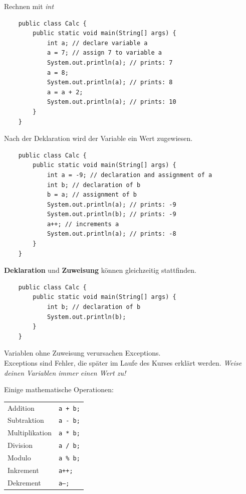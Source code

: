 \begin{frame}{Rechnen mit \emph{int}}
	\begin{lstlisting}
	public class Calc {
	    public static void main(String[] args) {
	        int a; // declare variable a
	        a = 7; // assign 7 to variable a
	        System.out.println(a); // prints: 7
	        a = 8;
	        System.out.println(a); // prints: 8
	        a = a + 2;
	        System.out.println(a); // prints: 10
	    }
	}
	\end{lstlisting}
	Nach der Deklaration wird der Variable ein Wert zugewiesen.
\framebreak
	\begin{lstlisting}
	public class Calc {
	    public static void main(String[] args) {
	        int a = -9; // declaration and assignment of a
	        int b; // declaration of b
	        b = a; // assignment of b
	        System.out.println(a); // prints: -9
	        System.out.println(b); // prints: -9
	        a++; // increments a
	        System.out.println(a); // prints: -8
	    }
	}
	\end{lstlisting}
	\textbf{Deklaration} und \textbf{Zuweisung} können gleichzeitig stattfinden.
\framebreak
	\begin{lstlisting}
	public class Calc {
	    public static void main(String[] args) {
	        int b; // declaration of b
	        System.out.println(b);
	    }
	}
	\end{lstlisting}
	Variablen ohne Zuweisung verursachen Exceptions.\\
	Exceptions sind Fehler, die später im Laufe des Kurses erklärt werden.
	\vspace{1em}
	\emph{Weise deinen Variablen immer einen Wert zu!}
\framebreak

	Einige mathematische Operationen:
	\begin{tabular}{ll}
		Addition & \texttt{a + b;} \\
		Subtraktion & \texttt{a - b;} \\
		Multiplikation &\texttt{a * b;} \\
		Division & \texttt{a / b;} \\
		Modulo & \texttt{a \% b;} \\
		Inkrement & \texttt{a++;} \\
		Dekrement & \texttt{a--;} \\
	\end{tabular}
\end{frame}

